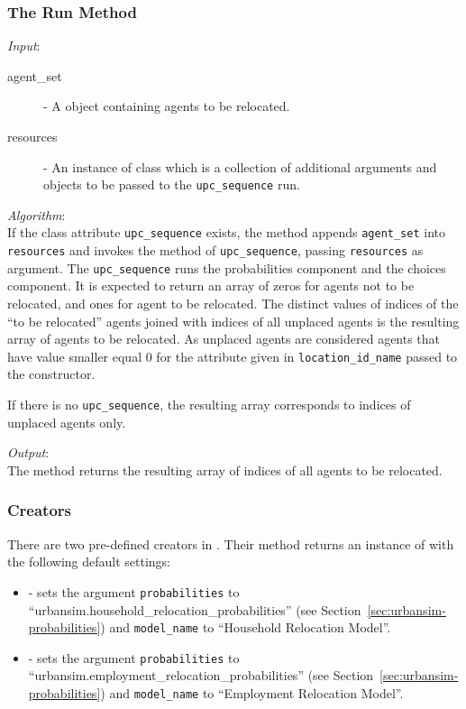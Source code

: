 %
\subsubsection{The Run Method}
%
{\it Input}:
\begin{description}
\item[agent_set] - A  \datasetindex object containing agents to be relocated.
\item[resources] - An instance of class  which is a
  collection of additional arguments and objects to be passed to the
  \verb|upc_sequence| run.
\end{description}

{\it Algorithm}:~\\[1mm]
If the class attribute \verb|upc_sequence| exists, the method appends \verb|agent_set| into \verb|resources| and invokes the
 method of \verb|upc_sequence|, passing \verb|resources| as
argument. The \verb|upc_sequence| runs the probabilities component and the
choices component. It is expected to return an array of zeros for agents
not to be relocated, and ones for agent to be relocated. The distinct values
of indices of the ``to be relocated'' agents joined with indices of all
unplaced agents is the resulting array of agents to be relocated. As unplaced
agents are considered agents that have value smaller equal 0 for the attribute \attributesindex
given in \verb|location_id_name| passed to the constructor. 

If there is no \verb|upc_sequence|,
the resulting array corresponds to indices of unplaced agents only. 

{\it Output}:~\\[1mm]
The method returns the resulting array of indices of all agents to be
relocated.

%
\subsubsection{Creators}
%
There are two pre-defined creators in . Their method
 \modelsindex returns an instance of
 \modelsindex with the following default settings:
\begin{itemize}
\item {} \modelsindex - sets the argument
  \verb|probabilities| to ``urbansim.household_relocation_probabilities''
  (see Section~\ref{sec:urbansim-probabilities}) and \verb|model_name| \modelsindex to
  ``Household Relocation Model''. \modelsindex
\item {} \modelsindex - sets the argument
  \verb|probabilities| to
  ``urbansim.employment_relocation_probabilities'' (see
  Section~\ref{sec:urbansim-probabilities}) and \verb|model_name| \modelsindex to
  ``Employment Relocation Model''.  \modelsindex
\end{itemize}


